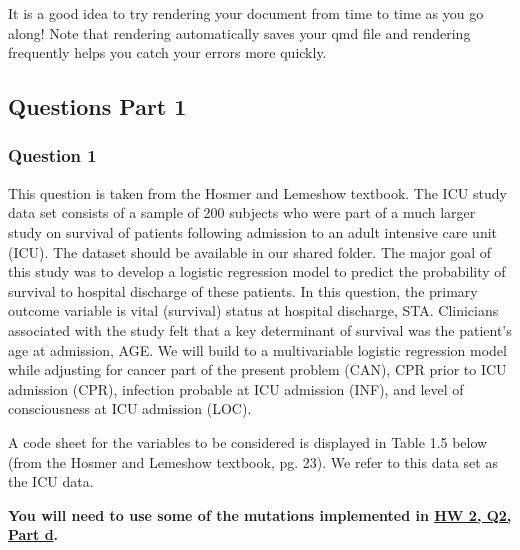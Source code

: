 \documentclass[
  letterpaper,
  DIV=11,
  numbers=noendperiod]{scrartcl}
\begin{document}
\begin{tcolorbox}[enhanced jigsaw, left=2mm, colback=white, opacityback=0, bottomrule=.15mm, colframe=quarto-callout-tip-color-frame, rightrule=.15mm, breakable, coltitle=black, arc=.35mm, toptitle=1mm, bottomtitle=1mm, opacitybacktitle=0.6, leftrule=.75mm, titlerule=0mm, toprule=.15mm, colbacktitle=quarto-callout-tip-color!10!white, title=\textcolor{quarto-callout-tip-color}{\faLightbulb}\hspace{0.5em}{Tip}]

It is a good idea to try rendering your document from time to time as
you go along! Note that rendering automatically saves your qmd file and
rendering frequently helps you catch your errors more quickly.

\end{tcolorbox}

\subsection{Questions Part 1}\label{questions-part-1}

\subsubsection{Question 1}\label{question-1}

This question is taken from the Hosmer and Lemeshow textbook. The ICU
study data set consists of a sample of 200 subjects who were part of a
much larger study on survival of patients following admission to an
adult intensive care unit (ICU). The dataset should be available in our
shared folder. The major goal of this study was to develop a logistic
regression model to predict the probability of survival to hospital
discharge of these patients. In this question, the primary outcome
variable is vital (survival) status at hospital discharge, STA.
Clinicians associated with the study felt that a key determinant of
survival was the patient's age at admission, AGE. We will build to a
multivariable logistic regression model while adjusting for cancer part
of the present problem (CAN), CPR prior to ICU admission (CPR),
infection probable at ICU admission (INF), and level of consciousness at
ICU admission (LOC).

A code sheet for the variables to be considered is displayed in Table
1.5 below (from the Hosmer and Lemeshow textbook, pg. 23). We refer to
this data set as the ICU data.

\textbf{You will need to use some of the mutations implemented in
\href{https://nwakim.github.io/BSTA_513_S25/homework/HW_02.html\#part-d-1}{HW
2, Q2, Part d}.}
\end{document}
